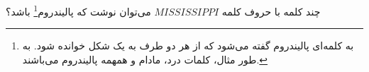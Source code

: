 \p
چند کلمه با حروف کلمه
$MISSISSIPPI$
می‌توان نوشت که 
پالیندروم\footnote{به کلمه‌ای پالیندروم گفته می‌شود که از هر دو طرف به یک شکل خوانده شود. به طور مثال، کلمات درد، مادام و همهمه پالیندروم می‌باشند.}
 باشد؟
 